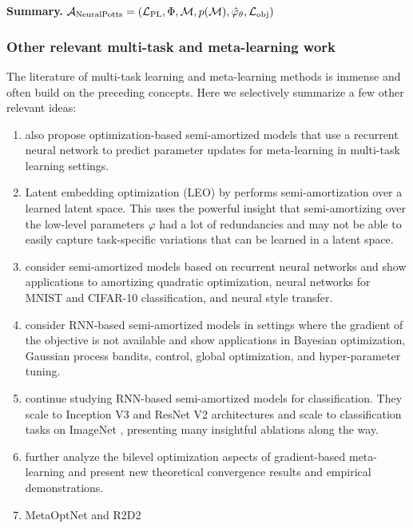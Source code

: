 \documentclass[twoside,11pt]{article}
\begin{document}
\textbf{Summary.} ${\mathcal{A}}_{\rm NeuralPotts}=({\mathcal{L}}_{\rm PL}, \Phi, {\mathcal{M}}, p({\mathcal{M}}), \hat \varphi_\theta, {\mathcal{L}}_{\rm obj})$

\subsubsection{Other relevant multi-task and meta-learning work}
The literature of multi-task learning and meta-learning
methods is immense and often build on the preceding concepts.
Here we selectively summarize a few other relevant ideas:

\begin{enumerate}
\item \citet{ravi2016optimization} also propose optimization-based
  semi-amortized models that use a recurrent neural network
  to predict parameter updates for meta-learning in multi-task
  learning settings.
\item Latent embedding optimization (LEO) by \citet{rusu2018meta}
  performs semi-amortization over a learned latent space.
  This uses the powerful insight that semi-amortizing over
  the low-level parameters $\varphi$ had a lot of redundancies
  and may not be able to easily capture task-specific
  variations that can be learned in a latent space.
\item \citet{andrychowicz2016learning}
  consider semi-amortized models based on recurrent neural networks
  and show applications to amortizing quadratic optimization,
  neural networks for MNIST and CIFAR-10 classification,
  and neural style transfer.
\item \citet{chen2017learning} consider RNN-based semi-amortized models
  in settings where the gradient of the objective is not available
  and show applications in Bayesian optimization,
  Gaussian process bandits, control, global optimization,
  and hyper-parameter tuning.
\item \citet{wichrowska2017learned} continue studying
  RNN-based semi-amortized models for classification.
  They scale to Inception V3 \citep{szegedy2016rethinking}
  and ResNet V2 \citep{he2016identity} architectures
  and scale to classification tasks on ImageNet
  \citep{russakovsky2015imagenet}, presenting many
  insightful ablations along the way.
\item \citet{franceschi2018bilevel} further analyze the
  bilevel optimization aspects of gradient-based meta-learning
  and present new theoretical convergence results and
  empirical demonstrations.
\item MetaOptNet \citep{lee2019meta} and R2D2 \citep{bertinetto2018meta}

\end{enumerate}
\end{document}
